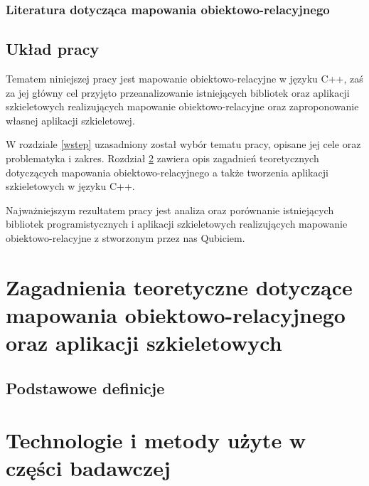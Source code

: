 \documentclass[12pt]{report}
\begin{document}
\subsection{Literatura dotycząca mapowania obiektowo-relacyjnego}

\section{Układ pracy} %

Tematem niniejszej pracy jest mapowanie obiektowo-relacyjne w języku C++, zaś za jej główny cel przyjęto przeanalizowanie istniejących bibliotek oraz aplikacji szkieletowych
realizujących mapowanie obiektowo-relacyjne oraz zaproponowanie własnej aplikacji szkieletowej.

W rozdziale \ref{wstep} uzasadniony został wybór tematu pracy, opisane jej cele oraz problematyka i zakres. Rozdział \ref{teoria} zawiera opis zagadnień teoretycznych
do\-ty\-czą\-cych mapowania obiektowo-relacyjnego a także tworzenia aplikacji szkieletowych w języku C++.

Najważniejszym rezultatem pracy jest analiza oraz porównanie istniejących bibliotek programistycznych i aplikacji szkieletowych realizujących mapowanie obiekt\-owo-rel\-acyjne
z stworzonym przez nas Qubiciem.

\chapter[Zagadnienia teoretyczne]{Zagadnienia teoretyczne dotyczące mapowania obiektowo-relacyjnego oraz aplikacji szkieletowych} \label{teoria}


\section{Podstawowe definicje} %

\chapter{Technologie i metody użyte w części badawczej} \label{technologie} %
\end{document}
